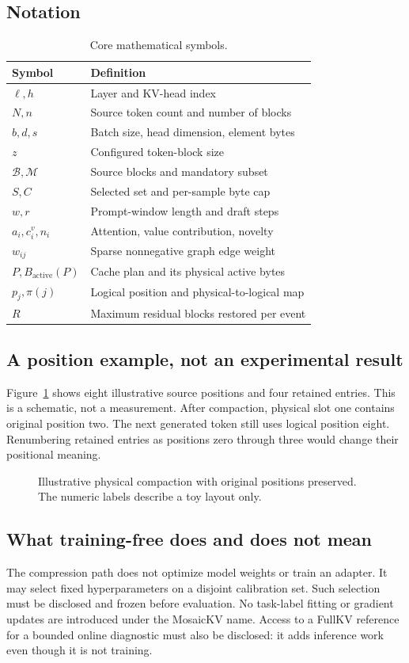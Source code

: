 \subsection{Notation}
\begin{table}[h]
\caption{Core mathematical symbols.}
\small\begin{tabularx}{\columnwidth}{lY}\toprule
Symbol & Definition\\\midrule
$\ell,h$ & Layer and KV-head index\\
$N,n$ & Source token count and number of blocks\\
$b,d,s$ & Batch size, head dimension, element bytes\\
$z$ & Configured token-block size\\
$\mathcal B,\mathcal M$ & Source blocks and mandatory subset\\
$S,C$ & Selected set and per-sample byte cap\\
$w,r$ & Prompt-window length and draft steps\\
$a_i,c_i^v,n_i$ & Attention, value contribution, novelty\\
$w_{ij}$ & Sparse nonnegative graph edge weight\\
$P,B_{\mathrm{active}}(P)$ & Cache plan and its physical active bytes\\
$p_j,\pi(j)$ & Logical position and physical-to-logical map\\
$R$ & Maximum residual blocks restored per event\\
\bottomrule\end{tabularx}
\end{table}

\subsection{A position example, not an experimental result}
Figure~\ref{fig:logical} shows eight illustrative source positions and four
retained entries. This is a schematic, not a measurement. After compaction,
physical slot one contains original position two. The next generated token
still uses logical position eight. Renumbering retained entries as positions
zero through three would change their positional meaning.

\begin{figure}[h]
\centering
\caption{Illustrative physical compaction with original positions preserved.
The numeric labels describe a toy layout only.}
\label{fig:logical}
\end{figure}

\subsection{What training-free does and does not mean}
The compression path does not optimize model weights or train an adapter.
It may select fixed hyperparameters on a disjoint calibration set. Such
selection must be disclosed and frozen before evaluation. No task-label fitting
or gradient updates are introduced under the MosaicKV name. Access to a
FullKV reference for a bounded online diagnostic must also be disclosed: it
adds inference work even though it is not training.
